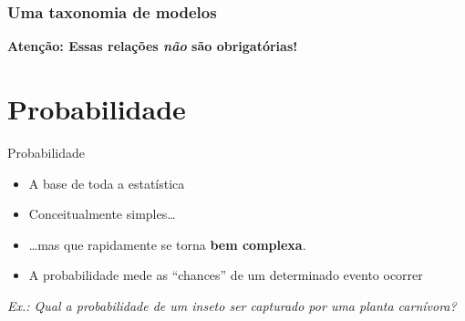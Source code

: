 \documentclass{beamer}\usepackage[]{graphicx}\usepackage[]{color}
\begin{document}
\begin{frame}[t]
    \frametitle{Uma taxonomia de modelos}

\vfill

 {\textbf{Atenção: Essas relações \emph{não} são obrigatórias!}}

\end{frame}

\section{Probabilidade}

\begin{frame}{Probabilidade}

 \begin{itemize}
   \item A base de toda a estatística
    \vfill
   \item Conceitualmente simples\ldots
    \vfill
   \item \ldots mas que rapidamente se torna \textbf{bem complexa}.
    \vfill
   \item A probabilidade mede as ``chances'' de um determinado evento ocorrer
 \end{itemize}
 \vfill
\emph{Ex.: Qual a probabilidade de um inseto ser capturado por uma planta carnívora?}

\end{frame} 
\end{document}
